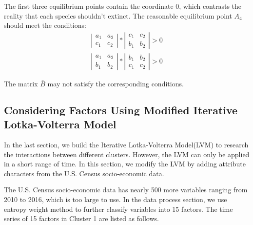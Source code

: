 \documentclass[12pt]{article}
\begin{document}
The first three equilibrium points contain the coordinate 0, which contrasts the reality that each species shouldn't extinct. The reasonable equilibrium point $A_{4}$ should meet the conditions:
\begin{gather*}
	\left \vert 
	\begin{matrix}
		a_{1} & a_{2} \\
		c_{1} & c_{2} 
	\end{matrix}
	\right \vert
	\ast
	\left \vert
	\begin{matrix}
		c_{1} & c_{2} \\
		b_{1} & b_{2}
	\end{matrix}
	\right \vert
	> 0 \\
	\left \vert 
	\begin{matrix}
		a_{1} & a_{2} \\
		b_{1} & b_{2} 
	\end{matrix}
	\right \vert
	\ast
	\left \vert
	\begin{matrix}
		b_{1} & b_{2} \\
		c_{1} & c_{2}
	\end{matrix}
	\right \vert
	> 0
\end{gather*}

The matrix $\bar B$ may not satisfy the corresponding conditions.

\subsection{Considering Factors Using Modified Iterative Lotka-Volterra Model}
In the last section, we build the Iterative Lotka-Volterra Model(LVM) to research the interactions between different clusters. However, the LVM can only be applied in a short range of time. In this section, we modify the LVM by adding attribute characters from the U.S. Census socio-economic data.

The U.S. Census socio-economic data has nearly 500 more variables ranging from 2010 to 2016, which is too large to use. In the data process section, we use entropy weight method to further classify variables into 15 factors. The time series of 15 factors in Cluster 1 are listed as follows.
\end{document}
